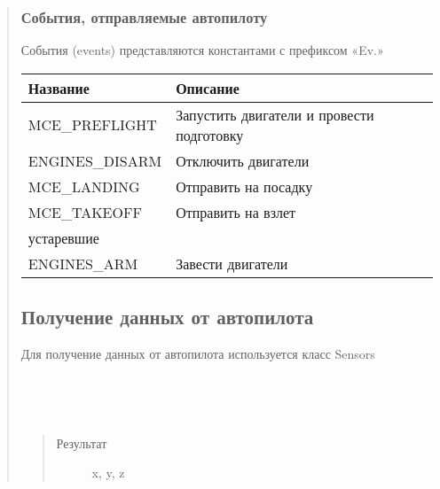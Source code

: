 \documentclass[a4paper,10pt,russian]{sphinxmanual}
\begin{document}
\begin{quote}
\subsubsection{События, отправляемые автопилоту}
\label{\detokenize{programming/lua/lua:outluaevent}}\label{\detokenize{programming/lua/lua:id3}}
События (events) представляются константами с префиксом «Ev.»


\begin{savenotes}\sphinxattablestart
\centering
\begin{tabulary}{\linewidth}[t]{|T|T|}
\hline
\sphinxstyletheadfamily 
Название
&\sphinxstyletheadfamily 
Описание
\\
\hline
MCE\_PREFLIGHT
&
Запустить двигатели и провести подготовку
\\
\hline
ENGINES\_DISARM
&
Отключить двигатели
\\
\hline
MCE\_LANDING
&
Отправить на посадку
\\
\hline
MCE\_TAKEOFF
&
Отправить на взлет
\\
\hline
\textendash{}устаревшие\textendash{}
&\\
\hline
ENGINES\_ARM
&
Завести двигатели
\\
\hline
\end{tabulary}
\par
\sphinxattableend\end{savenotes}


\subsection{Получение данных от автопилота}
\label{\detokenize{programming/lua/lua:id4}}
Для получение данных от автопилота используется класс Sensors

\begin{fulllineitems}
\label{\detokenize{programming/lua/lua:Sensors}}~

\begin{fulllineitems}
\label{\detokenize{programming/lua/lua:Sensors.lpsPosition}}~\begin{quote}\begin{description}
\item[{Результат}] \leavevmode
x, y, z

\end{description}\end{quote}


\end{fulllineitems}
\end{fulllineitems}
\end{quote}
\end{document}
